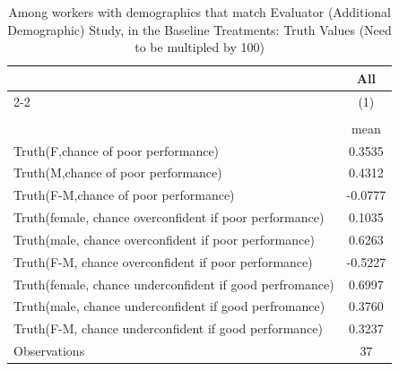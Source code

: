 \begin{table}[htbp]\centering
\def\sym#1{\ifmmode^{#1}\else\(^{#1}\)\fi}
\caption{Among workers with demographics that match Evaluator (Additional Demographic) Study, in the Baseline Treatments: Truth Values (Need to be multipled by 100)}
\begin{tabular}{l*{1}{c}}
\hline\hline
                    &\multicolumn{1}{c}{All}\\\cmidrule(lr){2-2}
                    &\multicolumn{1}{c}{(1)}\\
                    &\multicolumn{1}{c}{}\\
                    &        mean\\
\hline
Truth(F,chance of poor performance)&      0.3535\\
Truth(M,chance of poor performance)&      0.4312\\
Truth(F-M,chance of poor performance)&     -0.0777\\
Truth(female, chance overconfident if poor performance)&      0.1035\\
Truth(male, chance overconfident if poor performance)&      0.6263\\
Truth(F-M, chance overconfident if poor performance)&     -0.5227\\
Truth(female, chance underconfident if good perfromance)&      0.6997\\
Truth(male, chance underconfident if good perfromance)&      0.3760\\
Truth(F-M, chance underconfident if good performance)&      0.3237\\
\hline
Observations        &          37\\
\hline\hline
\end{tabular}
\end{table}
